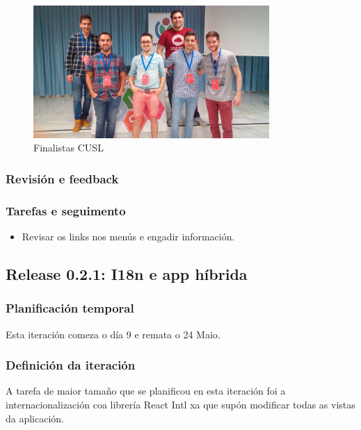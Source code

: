     \begin{figure}[h!]
          \begin{center}
            \includegraphics[width=0.8\textwidth]{./img/final_cusl.jpg}
            \caption{Finalistas CUSL}
          \end{center}
    \end{figure}

      \subsubsection{Revisión e feedback}

      \subsubsection{Tarefas e seguimento}
        \begin{itemize}
        \item Revisar os links nos menús e engadir información.
        \end{itemize}


    \subsection{Release 0.2.1: I18n e app híbrida}

      \subsubsection{Planificación temporal}
      Esta iteración comeza o día 9 e remata o 24 Maio.

      \subsubsection{Definición da iteración}
      A tarefa de maior tamaño que se planificou en esta iteración foi a 
internacionalización coa librería React Intl xa que supón modificar todas as 
vistas da aplicación.

